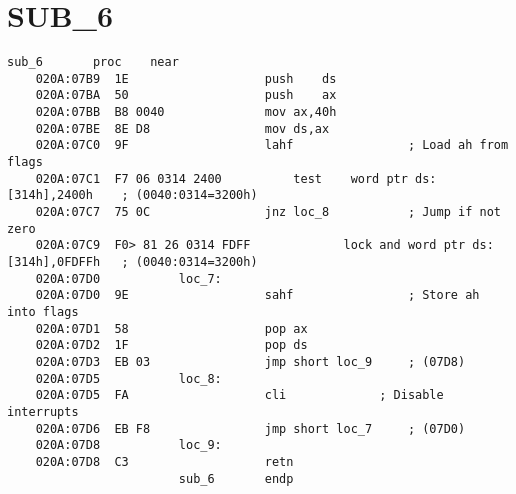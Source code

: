 \documentclass[a4paper,12pt]{bmstu}
\begin{document}
\section{SUB\_6}\label{subsec:sub_6}
\begin{lstlisting}[style={asm},label={lst:SUB_6}]
                        sub_6		proc	near
    020A:07B9  1E					push	ds
    020A:07BA  50					push	ax
    020A:07BB  B8 0040				mov	ax,40h
    020A:07BE  8E D8				mov	ds,ax
    020A:07C0  9F					lahf				; Load ah from flags
    020A:07C1  F7 06 0314 2400			test	word ptr ds:[314h],2400h	; (0040:0314=3200h)
    020A:07C7  75 0C				jnz	loc_8			; Jump if not zero
    020A:07C9  F0> 81 26 0314 FDFF	           lock	and	word ptr ds:[314h],0FDFFh	; (0040:0314=3200h)
    020A:07D0			loc_7:
    020A:07D0  9E					sahf				; Store ah into flags
    020A:07D1  58					pop	ax
    020A:07D2  1F					pop	ds
    020A:07D3  EB 03				jmp	short loc_9		; (07D8)
    020A:07D5			loc_8:
    020A:07D5  FA					cli				; Disable interrupts
    020A:07D6  EB F8				jmp	short loc_7		; (07D0)
    020A:07D8			loc_9:
    020A:07D8  C3					retn
                        sub_6		endp
\end{lstlisting}

\clearpage
\end{document}
